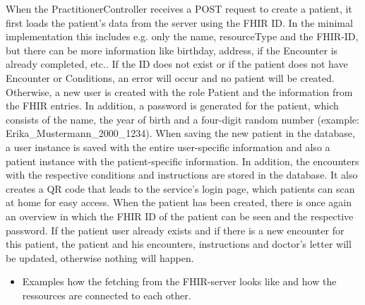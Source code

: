 \documentclass[]{report}
\begin{document}
When the PractitionerController receives a POST request to create a patient, it first loads the patient's data from the server using the FHIR ID. In the minimal implementation this includes e.g. only the name, resourceType and the FHIR-ID, but there can be more information like birthday, address, if the Encounter is already completed, etc.. If the ID does not exist or if the patient does not have Encounter or Conditions, an error will occur and no patient will be created. Otherwise, a new user is created with the role Patient and the information from the FHIR entries. In addition, a password is generated for the patient, which consists of the name, the year of birth and a four-digit random number (example: Erika\_Mustermann\_2000\_1234). When saving the new patient in the database, a user instance is saved with the entire user-specific information and also a patient instance with the patient-specific information. In addition, the encounters with the respective conditions and instructions are stored in the database. It also creates a QR code that leads to the service's login page, which patients can scan at home for easy access. When the patient has been created, there is once again an overview in which the FHIR ID of the patient can be seen and the respective password. If the patient user already exists and if there is a new encounter for this patient, the patient and his encounters, instructions and doctor's letter will be updated, otherwise nothing will happen.\\
\begin{itemize}
    \item Examples how the fetching from the FHIR-server looks like and how the ressources are connected to each other.
\end{itemize}
\end{document}
